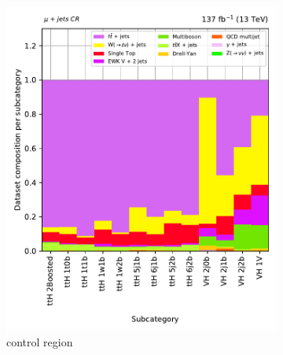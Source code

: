 \begin{figure}[htbp]
    \centering
    \begin{subfigure}[b]{0.33\textwidth}
        \includegraphics[width=\textwidth]{figures/region_plots/full_Run2/region_1/background_composition.pdf}
        \caption{\singleMuCr control region}
    \end{subfigure}
    \hspace{0.05\textwidth}
    \begin{subfigure}[b]{0.33\textwidth}

\end{subfigure}
\end{figure}
